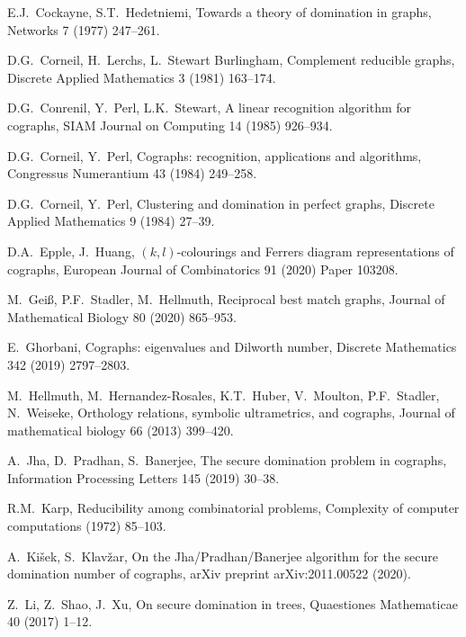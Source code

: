 \documentclass[12pt,a4paper,twoside]{article}
\theoremstyle{definition} %
\theoremstyle{plain} %
\numberwithin{equation}{section}  %
\begin{document}
\begin{thebibliography}{99}
    E.J.~Cockayne, S.T.~Hedetniemi,
    Towards a theory of domination in graphs,
    Networks 7 (1977) 247--261.
    
    D.G.~Corneil, H.~Lerchs, L.~Stewart Burlingham,
    Complement reducible graphs,
    Discrete Applied Mathematics 3 (1981) 163--174.
    
    D.G.~Conrenil, Y.~Perl, L.K.~Stewart,
    A linear recognition algorithm for cographs,
    SIAM Journal on Computing 14 (1985) 926--934.
   
    D.G.~Corneil, Y.~Perl,
    Cographs: recognition, applications and algorithms,
    Congressus Numerantium 43 (1984) 249--258.
    
    D.G.~Corneil, Y.~Perl,
    Clustering and domination in perfect graphs,
    Discrete Applied Mathematics 9 (1984) 27--39.
    
    D.A.~Epple, J.~Huang,
    $(k, l)$-colourings and Ferrers diagram representations of cographs,
    European Journal of Combinatorics 91 (2020) Paper 103208.
    
    M.~Gei{\ss}, P.F.~Stadler, M.~Hellmuth,
    Reciprocal best match graphs,
    Journal of Mathematical Biology 80 (2020) 865--953.
    
    E.~Ghorbani,
    Cographs: eigenvalues and Dilworth number,
    Discrete Mathematics 342 (2019) 2797--2803.

    M.~Hellmuth, M.~Hernandez-Rosales, K.T.~Huber, V.~Moulton, P.F.~Stadler, N.~Weiseke,
    Orthology relations, symbolic ultrametrics, and cographs,
    Journal of mathematical biology 66 (2013) 399--420.

  A.~Jha, D.~Pradhan, S.~Banerjee, 
  The secure domination problem in cographs,
  Information Processing Letters 145 (2019) 30--38.
  
    R.M.~Karp,
    Reducibility among combinatorial problems,
    Complexity of computer computations (1972) 85--103.
    
    A.~Kišek, S.~Klavžar,
    On the Jha/Pradhan/Banerjee algorithm for the secure domination number of cographs,
    arXiv preprint arXiv:2011.00522 (2020).
    
    Z.~Li, Z.~Shao, J.~Xu,
    On secure domination in trees,
    Quaestiones Mathematicae 40 (2017) 1--12.
    

\end{thebibliography}
\end{document}
